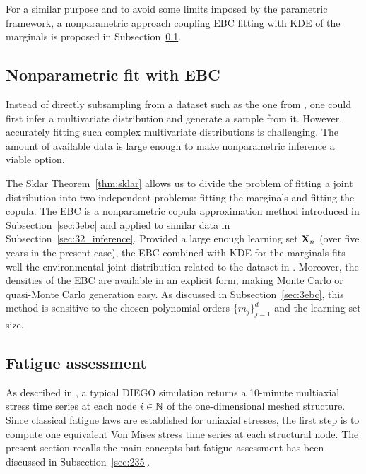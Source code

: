 For a similar purpose and to avoid some limits imposed by the parametric framework, a nonparametric approach coupling EBC fitting with KDE of the marginals is proposed in Subsection~\ref{sec:4ebc}.


\subsection{Nonparametric fit with EBC}\label{sec:4ebc}
Instead of directly subsampling from a dataset such as the one from , one could first infer a multivariate distribution and generate a sample from it. 
However, accurately fitting such complex multivariate distributions is challenging. 
The amount of available data is large enough to make nonparametric inference a viable option.

The Sklar Theorem~\ref{thm:sklar} allows us to divide the problem of fitting a joint distribution into two independent problems: fitting the marginals and fitting the copula. 
The EBC is a nonparametric copula approximation method introduced in Subsection~\ref{sec:3ebc} and applied to similar data in Subsection~\ref{sec:32_inference}. 
Provided a large enough learning set ${\bf X}_n$ (over five years in the present case), the EBC combined with KDE for the marginals fits well the environmental joint distribution related to the dataset in . 
Moreover, the densities of the EBC are available in an explicit form, making Monte Carlo or quasi-Monte Carlo generation easy. 
As discussed in Subsection~\ref{sec:3ebc}, this method is sensitive to the chosen polynomial orders $\{m_j\}_{j=1}^d$ and the learning set size. 


\subsection{Fatigue assessment}
As described in , a typical DIEGO simulation returns a 10-minute multiaxial stress time series at each node $i \in \mathbb{N}$ of the one-dimensional meshed structure. 
Since classical fatigue laws are established for uniaxial stresses, the first step is to compute one equivalent Von Mises stress time series at each structural node.
The present section recalls the main concepts but fatigue assessment has been discussed in Subsection~\ref{sec:235}. 

